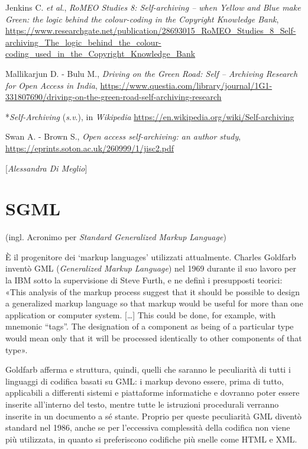 {{Jenkins C. \emph{et} \emph{al}., \emph{RoMEO Studies 8: Self-archiving
-- when Yellow and Blue make Green: the logic behind the colour-coding
in the Copyright Knowledge Bank},
\url{https://www.researchgate.net/publication/28693015_RoMEO_Studies_8_Self-archiving_The_logic_behind_the_colour-coding_used_in_the_Copyright_Knowledge_Bank}

Mallikarjun D. - Bulu M., \emph{Driving on the Green Road: Self --
Archiving Research for Open Access in India},
\url{https://www.questia.com/library/journal/1G1-331807690/driving-on-the-green-road-self-archiving-research}

*\emph{Self-Archiving} (\emph{s.v}.), in \emph{Wikipedia}
\url{https://en.wikipedia.org/wiki/Self-archiving}

Swan A. - Brown S., \emph{Open access self-archiving: an author study},
\url{https://eprints.soton.ac.uk/260999/1/jisc2.pdf}

}

\hrulefill 
 
{[}\emph{Alessandra Di Meglio}{]}




\chapter{SGML}

(ingl. Acronimo per \emph{Standard Generalized Markup Language})

È il progenitore dei `markup languages' utilizzati attualmente. Charles
Goldfarb inventò GML (\emph{Generalized Markup Language}) nel 1969
durante il suo lavoro per la IBM sotto la supervisione di Steve Furth, e
ne definì i presupposti teorici: «This analysis of the markup process
suggest that it should be possible to design a generalized markup
language so that markup would be useful for more than one application or
computer system. {[}\ldots{}{]} This could be done, for example, with
mnemonic ``tags''. The designation of a component as being of a
particular type would mean only that it will be processed identically to
other components of that type».

Goldfarb afferma e struttura, quindi, quelli che saranno le peculiarità
di tutti i linguaggi di codifica basati su GML: i markup devono essere,
prima di tutto, applicabili a differenti sistemi e piattaforme
informatiche e dovranno poter essere inserite all'interno del testo,
mentre tutte le istruzioni procedurali verranno inserite in un documento
a sé stante. Proprio per queste peculiarità GML diventò standard nel
1986, anche se per l'eccessiva complessità della codifica non viene più
utilizzata, in quanto si preferiscono codifiche più snelle come HTML e
XML.

}
